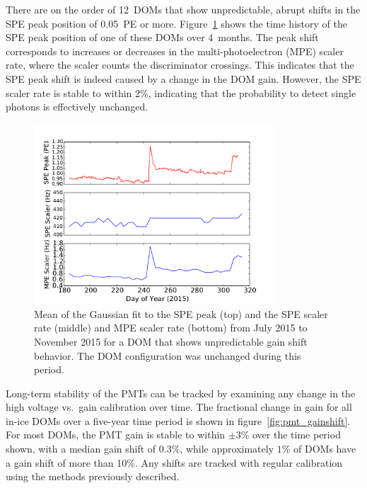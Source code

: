 There are on the order of 12~DOMs that show unpredictable, abrupt shifts in the SPE peak
position of 0.05~PE or more. Figure~\ref{fig:gainshift_spe} shows the time history of the
SPE peak position of one of these DOMs over 4~months. The peak shift
corresponds to increases or decreases in the multi-photoelectron (MPE)
scaler rate, where the scaler counts the discriminator crossings.  This
indicates that the SPE peak shift is indeed caused by a change in the DOM
gain. However, the SPE scaler rate is stable to within 2\%, indicating that the
probability to detect single photons is effectively unchanged.

\begin{figure}[!h]
 \centering
 \includegraphics[width=0.8\textwidth]{graphics/dom/reliability/gainshift.pdf}
 \caption{Mean of the Gaussian fit to the SPE peak (top) and the SPE
   scaler rate (middle) and MPE
   scaler rate (bottom) from July 2015 to November 2015 for a DOM
   that shows unpredictable gain shift behavior. The DOM
   configuration was unchanged during this period.}
 \label{fig:gainshift_spe}
\end{figure}

Long-term stability of the PMTs can be tracked by examining any change in
the high voltage vs.~gain calibration over time.  The fractional change in gain for
all in-ice DOMs over a five-year time period is shown in
figure~\ref{fig:pmt_gainshift}.  For most DOMs, the PMT gain is stable to
within $\pm3\%$ over the time period shown, with a median gain shift of $0.3\%$, while approximately $1\%$ 
of DOMs have a gain shift of more than 10\%.  Any shifts are tracked with
regular calibration using the methods previously described.

